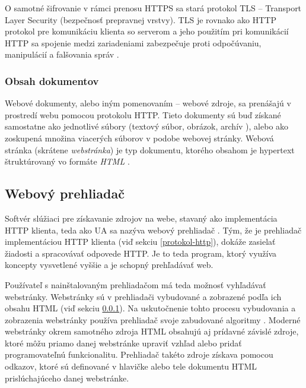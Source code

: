 O samotné šifrovanie v rámci prenosu HTTPS sa stará protokol TLS -- Transport Layer Security (bezpečnosť prepravnej vrstvy).
TLS je rovnako ako HTTP protokol pre komunikáciu klienta so serverom a jeho použitím pri komunikácií HTTP sa spojenie medzi zariadeniami zabezpečuje proti odpočúvaniu, manipulácií a falšovania správ \cite{cloudflare-tls}. 


\subsubsection{Obsah dokumentov}
\label{obsah-hladanych-dokumentov}

Webové dokumenty, alebo iným pomenovaním -- webové zdroje, sa prenášajú v prostredí webu pomocou protokolu HTTP.
Tieto dokumenty sú buď získané samostatne ako jednotlivé súbory (textový súbor, obrázok, archív ), alebo ako zoskupená množina viacerých súborov v podobe webovej stránky.
Webová stránka (skrátene \emph{webstránka}) je typ dokumentu, ktorého obsahom je hypertext štruktúrovaný vo formáte \emph{HTML} \cite{documents-webpage}.


\subsection{Webový prehliadač}
\label{webovy-prehliadac}


Softvér slúžiaci pre získavanie zdrojov na webe, stavaný ako implementácia HTTP klienta, teda ako UA sa nazýva webový prehliadač \cite{mdn-docs-browser}. 
Tým, že je prehliadač implementáciou HTTP klienta (viď sekciu \ref{protokol-http}), dokáže zasielať žiadosti a spracovávať odpovede HTTP.
Je to teda program, ktorý využíva koncepty vysvetlené vyššie a je schopný prehľadávať web.

Používateľ s nainštalovaným prehliadačom má teda možnosť vyhľadávať webstránky.
Webstránky sú v prehliadači vybudované a zobrazené podľa ich obsahu HTML (viď sekciu \ref{obsah-hladanych-dokumentov}).
Na uskutočnenie tohto procesu vybudovania a zobrazenia webstránky používa prehliadač svoje zabudované algoritmy \cite{mdn-docs-how-browser-works}.
Moderné webstránky okrem samotného zdroja HTML obsahujú aj prídavné závislé zdroje, ktoré môžu priamo danej webstránke upraviť vzhľad alebo pridať programovateľnú funkcionalitu.
Prehliadač takéto zdroje získava pomocou odkazov, ktoré sú definované v hlavičke alebo tele dokumentu HTML prislúchajúceho danej webstránke.

